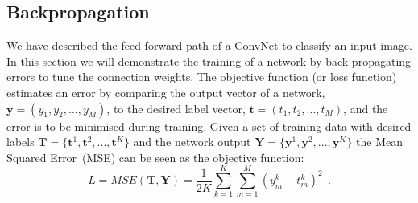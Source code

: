 \subsection{Backpropagation}
We have described the feed-forward path of a ConvNet to classify an input image.
In this section we will demonstrate the training of a network by back-propagating errors to tune the connection weights.
The objective function (or loss function) estimates an error by comparing the output vector of a network, $\mathbf{y}=(y_1,y_2,...,y_M)$, to the desired label vector, $\mathbf{t}=(t_1,t_2,...,t_M)$, and the error is to be minimised during training.
Given a set of training data with desired labels $\mathbf{T}=\{\mathbf{t}^1, \mathbf{t}^2, ..., \mathbf{t}^K\}$ and the network output $\mathbf{Y}=\{\mathbf{y}^1, \mathbf{y}^2, ..., \mathbf{y}^K\}$ the Mean Squared Error~(MSE) can be seen as the objective function:  
\begin{equation}
L={MSE}(\mathbf{T}, \mathbf{Y}) =\frac{1}{2K}\sum_{k=1}^K \sum_{m=1}^M (y^{k}_{m}-t^{k}_{m})^{2}~~.
\label{equ:loss_all}
\end{equation}

